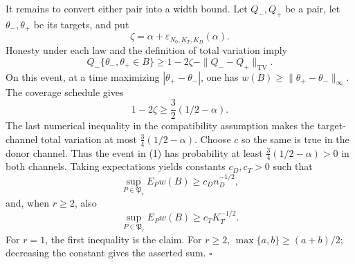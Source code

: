 It remains to convert either pair into a width bound. Let \(Q_-,Q_+\) be a pair, let \(\theta_-,\theta_+\) be its targets, and put
\[
 \zeta=\alpha+\varepsilon_{N_0,K_T,K_D}(\alpha).
\]
Honesty under each law and the definition of total variation imply
\[
 Q_-\{\theta_-,\theta_+\in B\}
 \ge1-2\zeta-\|Q_--Q_+\|_{\mathrm{TV}}. \tag{1}
\]
On this event, at a time maximizing \(|\theta_+-\theta_-|\), one has \(w(B)\ge\|\theta_+-\theta_-\|_\infty\). The coverage schedule gives
\[
 1-2\zeta\ge\frac32(1/2-\alpha).
\]
The last numerical inequality in the compatibility assumption makes the target-channel total variation at most \(\frac34(1/2-\alpha)\). Choose \(c\) so the same is true in the donor channel. Thus the event in (1) has probability at least \(\frac34(1/2-\alpha)>0\) in both channels. Taking expectations yields constants \(c_D,c_T>0\) such that
\[
 \sup_{P\in\mathfrak P_r}E_Pw(B)\ge c_Dn_D^{-1/2},
\]
and, when \(r\ge2\), also
\[
 \sup_{P\in\mathfrak P_r}E_Pw(B)\ge c_TK_T^{-1/2}.
\]
For \(r=1\), the first inequality is the claim. For \(r\ge2\), \(\max\{a,b\}\ge(a+b)/2\); decreasing the constant gives the asserted sum. \(\square\)